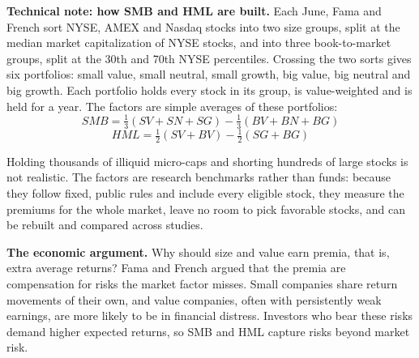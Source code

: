 \begin{technote}
\textbf{Technical note: how SMB and HML are built.} Each June, Fama and French sort NYSE, AMEX and Nasdaq stocks into two size groups, split at the median market capitalization of NYSE stocks, and into three book-to-market groups, split at the 30th and 70th NYSE percentiles. Crossing the two sorts gives six portfolios: small value, small neutral, small growth, big value, big neutral and big growth. Each portfolio holds every stock in its group, is value-weighted and is held for a year. The factors are simple averages of these portfolios:
\begin{equation}
  SMB = \tfrac{1}{3}(SV + SN + SG) - \tfrac{1}{3}(BV + BN + BG)
  \label{eq:04-smb}
\end{equation}
\begin{equation}
  HML = \tfrac{1}{2}(SV + BV) - \tfrac{1}{2}(SG + BG)
  \label{eq:04-hml}
\end{equation}

Holding thousands of illiquid micro-caps and shorting hundreds of large stocks is not realistic. The factors are research benchmarks rather than funds: because they follow fixed, public rules and include every eligible stock, they measure the premiums for the whole market, leave no room to pick favorable stocks, and can be rebuilt and compared across studies.

\end{technote}

\textbf{The economic argument.}  Why should size and value earn premia, that is, extra average returns? Fama and French argued that the premia are compensation for risks the market factor misses. Small companies share return movements of their own, and value companies, often with persistently weak earnings, are more likely to be in financial distress. Investors who bear these risks demand higher expected returns, so SMB and HML capture risks beyond market risk.

